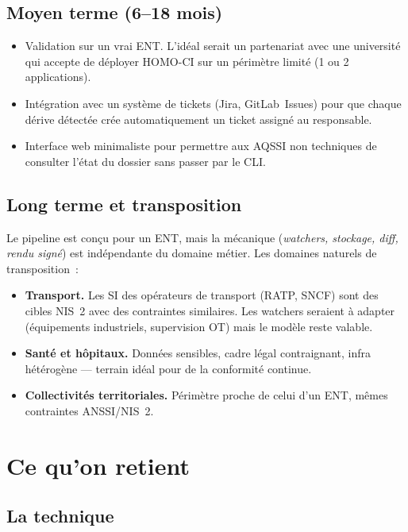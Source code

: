 \subsection{Moyen terme (6--18 mois)}

\begin{itemize}
  \item Validation sur un vrai ENT. L'idéal serait un partenariat
    avec une université qui accepte de déployer HOMO-CI sur un
    périmètre limité (1 ou 2 applications).
  \item Intégration avec un système de tickets (Jira,
    GitLab~Issues) pour que chaque dérive détectée crée
    automatiquement un ticket assigné au responsable.
  \item Interface web minimaliste pour permettre aux AQSSI non
    techniques de consulter l'état du dossier sans passer par
    le CLI.
\end{itemize}

\subsection{Long terme et transposition}

Le pipeline est conçu pour un ENT, mais la mécanique
(\emph{watchers, stockage, diff, rendu signé}) est
indépendante du domaine métier. Les domaines naturels de
transposition~:

\begin{itemize}
  \item \textbf{Transport.} Les SI des opérateurs de transport
    (RATP, SNCF) sont des cibles NIS~2 avec des contraintes
    similaires. Les watchers seraient à adapter (équipements
    industriels, supervision OT) mais le modèle reste valable.
  \item \textbf{Santé et hôpitaux.} Données sensibles, cadre
    légal contraignant, infra hétérogène --- terrain idéal pour
    de la conformité continue.
  \item \textbf{Collectivités territoriales.} Périmètre proche
    de celui d'un ENT, mêmes contraintes ANSSI/NIS~2.
\end{itemize}

\section{Ce qu'on retient}

\subsection{La technique}

